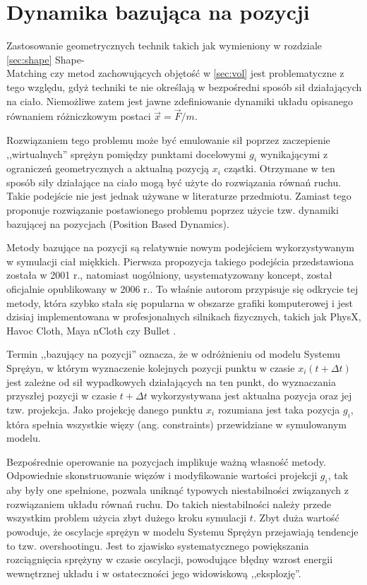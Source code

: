 \section{Dynamika bazująca na pozycji}
\label{sec:dyn}

Zastosowanie geometrycznych technik takich jak wymieniony w rozdziale
\ref{sec:shape}
Shape-\\
Matching czy metod zachowujących objętość w \ref{sec:vol}
jest problematyczne z tego względu, gdyż techniki te nie określają w bezpośredni
sposób sił działających na ciało. Niemożliwe zatem jest jawne zdefiniowanie dynamiki układu
opisanego równaniem różniczkowym postaci $\ddot{\vec{x}} = \vec{F}/m$.

Rozwiązaniem tego problemu może być emulowanie sił poprzez zaczepienie
,,wirtualnych'' sprężyn pomiędzy punktami docelowymi $g_i$ wynikającymi z ograniczeń
geometrycznych a aktualną pozycją $x_i$ cząstki. Otrzymane w ten sposób
siły działające na ciało mogą być użyte do rozwiązania równań ruchu.
Takie podejście nie jest jednak używane w literaturze przedmiotu. Zamiast tego
\cite{pbdyn} proponuje rozwiązanie postawionego problemu poprzez użycie
tzw. dynamiki bazującej na pozycjach (Position Based Dynamics).

Metody bazujące na pozycji są relatywnie nowym podejściem wykorzystywanym w symulacji
ciał miękkich. Pierwsza propozycja takiego podejścia przedstawiona została w
2001 r.\cite{jak}, natomiast uogólniony, usystematyzowany koncept, został oficjalnie
opublikowany w 2006 r.\cite{pbdyn}. To właśnie autorom \cite{pbdyn} przypisuje
się odkrycie tej metody, która szybko stała się popularna w obszarze grafiki
komputerowej i jest dzisiaj implementowana w profesjonalnych silnikach fizycznych,
takich jak PhysX, Havoc Cloth, Maya nCloth czy Bullet \cite{Liu:2013:FSM}.

Termin ,,bazujący na pozycji'' oznacza, że w odróżnieniu od modelu Systemu Sprężyn,
	   w którym wyznaczenie kolejnych pozycji punktu w czasie $x_i(t +
			   \Delta t)$ jest zależne od sił wypadkowych działających na ten
	   punkt, do wyznaczania przyszłej pozycji w czasie $t + \Delta t$
	   wykorzystywana jest aktualna pozycja oraz jej tzw. projekcja. Jako
	   projekcję danego punktu $x_i$ rozumiana jest taka pozycja $g_i$, która
	   spełnia wszystkie więzy (ang. constraints)
	przewidziane w symulowanym modelu.

Bezpośrednie operowanie na pozycjach implikuje ważną własność metody. Odpowiednie
skonstruowanie więzów i modyfikowanie wartości projekcji $g_i$, tak
aby były one spełnione, pozwala uniknąć typowych niestabilności związanych z
rozwiązaniem układu równań ruchu. Do takich niestabilności należy przede
wszystkim problem użycia zbyt dużego kroku symulacji $t$. Zbyt
duża wartość powoduje, że oscylacje sprężyn w modelu Systemu Sprężyn przejawiają
tendencje to tzw. overshootingu. Jest to zjawisko systematycznego powiększania rozciągnięcia
sprężyny w czasie oscylacji, powodujące błędny wzrost energii wewnętrznej układu i w
ostateczności jego widowiskową ,,eksplozję''.

